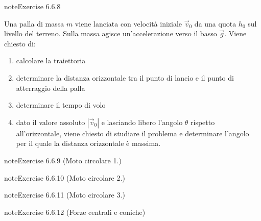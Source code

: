 \documentclass[letterpaper,10pt,italian]{jupyterBook}
\begin{document}
\begin{sphinxadmonition}{note}{Exercise 6.6.8}



\sphinxAtStartPar
Una palla di massa \(m\) viene lanciata con velocità iniziale \(\vec{v}_0\) da una quota \(h_0\) sul livello del terreno. Sulla massa agisce un’accelerazione verso il basso \(\vec{g}\). Viene chiesto di:
\begin{enumerate}
%
\item {} 
\sphinxAtStartPar
calcolare la traiettoria

\item {} 
\sphinxAtStartPar
determinare la distanza orizzontale tra il punto di lancio e il punto di atterraggio della palla

\item {} 
\sphinxAtStartPar
determinare il tempo di volo

\item {} 
\sphinxAtStartPar
dato il valore assoluto \(|\vec{v}_0|\) e lasciando libero l’angolo \(\theta\) rispetto all’orizzontale, viene chiesto di studiare il problema e determinare l’angolo per il quale la distanza orizzontale è massima.

\end{enumerate}
\end{sphinxadmonition}
 \label{exercise:ch/mechanics/kinematics-problems-exercise-8}

\begin{sphinxadmonition}{note}{Exercise 6.6.9 (Moto circolare 1.)}


\end{sphinxadmonition}
 \label{exercise:ch/mechanics/kinematics-problems-exercise-9}

\begin{sphinxadmonition}{note}{Exercise 6.6.10 (Moto circolare 2.)}


\end{sphinxadmonition}
 \label{exercise:ch/mechanics/kinematics-problems-exercise-10}

\begin{sphinxadmonition}{note}{Exercise 6.6.11 (Moto circolare 3.)}


\end{sphinxadmonition}
 \label{exercise:ch/mechanics/kinematics-problems-exercise-11}

\begin{sphinxadmonition}{note}{Exercise 6.6.12 (Forze centrali e coniche)}


\end{sphinxadmonition}
 \label{exercise:ch/mechanics/kinematics-problems-exercise-12}
\end{document}
